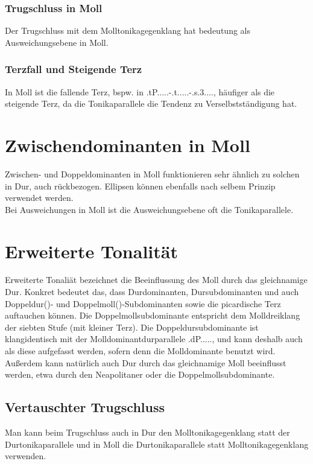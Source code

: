 \documentclass[a4paper]{article}
\newcommand{\bel}[5]{\HH.#1.#5.#2.#3.#4.}
\newcommand{\Tm}{\HH.t.....}
\newcommand{\SSm}{\HH.s.3....}
\begin{document}
	\subsubsection{Trugschluss in Moll}
	Der Trugschluss mit dem Molltonikagegenklang hat bedeutung als Ausweichungsebene in Moll.
	
	\subsubsection{Terzfall und Steigende Terz}
	In Moll ist die fallende Terz, bspw. in \bel{tP}{}{}{}{}-\Tm-\SSm, häufiger als die steigende Terz, da die Tonikaparallele die Tendenz zu Verselbstständigung hat.
	
	\section{Zwischendominanten in Moll}
	Zwischen- und Doppeldominanten in Moll funktionieren sehr ähnlich zu solchen in Dur, auch rückbezogen. Ellipsen können ebenfalls nach selbem Prinzip verwendet werden.\\ 
	Bei Ausweichungen in Moll ist die Ausweichungsebene oft die Tonikaparallele.
	
	\section{Erweiterte Tonalität}
	Erweiterte Tonaliät bezeichnet die Beeinflussung des Moll durch das gleichnamige Dur. Konkret bedeutet das, dass Durdominanten, Dursubdominanten und auch Doppeldur(\DS)- und Doppelmoll(\Ds)-Subdominanten  sowie die picardische Terz auftauchen können. Die Doppelmollsubdominante entspricht dem Molldreiklang der siebten Stufe (mit kleiner Terz). Die Doppeldursubdominante ist klangidentisch mit der Molldominantdurparallele \bel{dP}{}{}{}{}, und kann deshalb auch als diese aufgefasst werden, sofern denn die Molldominante benutzt wird.\\
	Außerdem kann natürlich auch Dur durch das gleichnamige Moll beeinflusst werden, etwa durch den Neapolitaner oder die Doppelmollsubdominante.\\
	
	\subsection{Vertauschter Trugschluss}
	Man kann beim Trugschluss auch in Dur den Molltonikagegenklang statt der Durtonikaparallele und in Moll die Durtonikaparallele statt Molltonikagegenklang verwenden. 
	
\end{document}
